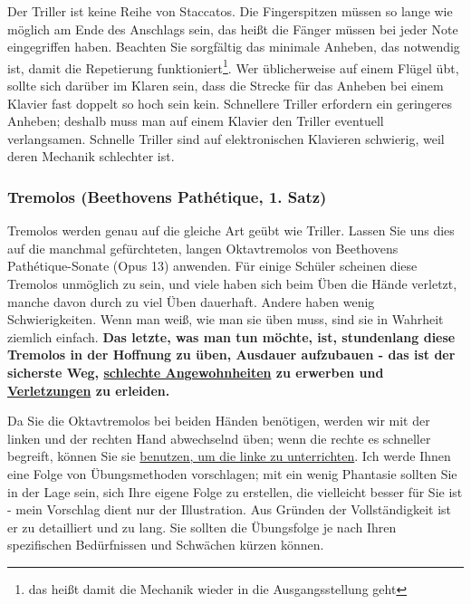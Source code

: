 Der Triller ist keine Reihe von Staccatos.
Die Fingerspitzen müssen so lange wie möglich am Ende des Anschlags sein, das heißt die Fänger müssen bei jeder Note eingegriffen haben.
Beachten Sie sorgfältig das minimale Anheben, das notwendig ist, damit die Repetierung funktioniert\footnote{das heißt damit die Mechanik wieder in die Ausgangsstellung geht}.
Wer üblicherweise auf einem Flügel übt, sollte sich darüber im Klaren sein, dass die Strecke für das Anheben bei einem Klavier fast doppelt so hoch sein kein.
Schnellere Triller erfordern ein geringeres Anheben; deshalb muss man auf einem Klavier den Triller eventuell verlangsamen.
Schnelle Triller sind auf elektronischen Klavieren schwierig, weil deren Mechanik schlechter ist.


\subsubsection{Tremolos (Beethovens Pathétique, 1. Satz)}
\label{c1iii3b}

Tremolos werden genau auf die gleiche Art geübt wie Triller.
Lassen Sie uns dies auf die manchmal gefürchteten, langen Oktavtremolos von Beethovens Pathétique-Sonate (Opus 13) anwenden.
Für einige Schüler scheinen diese Tremolos unmöglich zu sein, und viele haben sich beim Üben die Hände verletzt, manche davon durch zu viel Üben dauerhaft.
Andere haben wenig Schwierigkeiten.
Wenn man weiß, wie man sie üben muss, sind sie in Wahrheit ziemlich einfach.
\textbf{Das letzte, was man tun möchte, ist, stundenlang diese Tremolos in der Hoffnung zu üben, Ausdauer aufzubauen - das ist der sicherste Weg, \hyperref[c1ii22]{schlechte Angewohnheiten} zu erwerben und \hyperref[c1iii10hand]{Verletzungen} zu erleiden.}

Da Sie die Oktavtremolos bei beiden Händen benötigen, werden wir mit der linken und der rechten Hand abwechselnd üben; wenn die rechte es schneller begreift, können Sie sie \hyperref[c1ii20]{benutzen, um die linke zu unterrichten}.
Ich werde Ihnen eine Folge von Übungsmethoden vorschlagen; mit ein wenig Phantasie sollten Sie in der Lage sein, sich Ihre eigene Folge zu erstellen, die vielleicht besser für Sie ist - mein Vorschlag dient nur der Illustration.
Aus Gründen der Vollständigkeit ist er zu detailliert und zu lang.
Sie sollten die Übungsfolge je nach Ihren spezifischen Bedürfnissen und Schwächen kürzen können.

